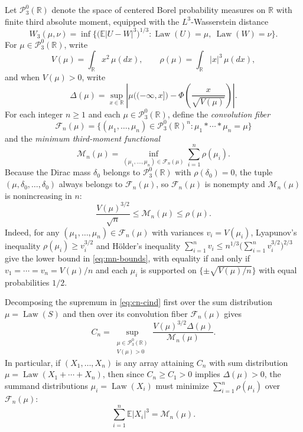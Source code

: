 \documentclass[11pt]{article}
\numberwithin{equation}{section}
\theoremstyle{definition}
\theoremstyle{remark}
\DeclareMathOperator{\Law}{Law}
\newcommand{\E}{\mathbb E}
\newcommand{\R}{\mathbb R}
\begin{document}
Let $\mathcal P_3^0(\R)$ denote the space of centered Borel probability
measures on $\R$ with finite third absolute moment, equipped with the
$L^3$-Wasserstein distance
\[
 W_3(\mu,\nu)=\inf\bigl\{\bigl(\E|U-W|^3\bigr)^{1/3}:\Law(U)=\mu,\ \Law(W)=\nu\bigr\}.
\]
For $\mu\in\mathcal P_3^0(\R)$, write
\[
 V(\mu)=\int_\R x^2\,\mu(dx),\qquad
 \rho(\mu)=\int_\R |x|^3\,\mu(dx),
\]
and when $V(\mu)>0$, write
\[
 \Delta(\mu)=\sup_{x\in\R}\left|\mu\bigl((-\infty,x]\bigr)-\Phi\!\left(\frac{x}{\sqrt{V(\mu)}}\right)\right|.
\]
For each integer $n\ge1$ and each $\mu\in\mathcal P_3^0(\R)$, define the
\emph{convolution fiber}
\begin{equation}\label{eq:fiber-def}
 \mathcal F_n(\mu)=\bigl\{(\mu_1,\ldots,\mu_n)\in\mathcal P_3^0(\R)^n:
 \mu_1*\cdots*\mu_n=\mu\bigr\}
\end{equation}
and the \emph{minimum third-moment functional}
\begin{equation}\label{eq:mn-def}
 \mathcal M_n(\mu)=\inf_{(\mu_1,\ldots,\mu_n)\in\mathcal F_n(\mu)}
 \sum_{i=1}^n\rho(\mu_i).
\end{equation}
Because the Dirac mass $\delta_0$ belongs to $\mathcal P_3^0(\R)$ with
$\rho(\delta_0)=0$, the tuple $(\mu,\delta_0,\ldots,\delta_0)$ always belongs
to $\mathcal F_n(\mu)$, so $\mathcal F_n(\mu)$ is nonempty and
$\mathcal M_n(\mu)$ is nonincreasing in $n$:
\begin{equation}\label{eq:mn-bounds}
 \frac{V(\mu)^{3/2}}{\sqrt n}\le \mathcal M_n(\mu)\le \rho(\mu).
\end{equation}
Indeed, for any $(\mu_1,\ldots,\mu_n)\in\mathcal F_n(\mu)$ with variances
$v_i=V(\mu_i)$, Lyapunov's inequality $\rho(\mu_i)\ge v_i^{3/2}$ and H\"older's
inequality $\sum_{i=1}^n v_i\le n^{1/3}\bigl(\sum_{i=1}^n v_i^{3/2}\bigr)^{2/3}$
give the lower bound in \eqref{eq:mn-bounds}, with equality if and only if
$v_1=\cdots=v_n=V(\mu)/n$ and each $\mu_i$ is supported on
$\{\pm\sqrt{V(\mu)/n}\}$ with equal probabilities $1/2$.

Decomposing the supremum in \eqref{eq:cn-cind} first over the sum distribution
$\mu=\Law(S)$ and then over its convolution fiber $\mathcal F_n(\mu)$ gives
\begin{equation}\label{eq:two-stage-opt}
 C_n=\sup_{\substack{\mu\in\mathcal P_3^0(\R)\\ V(\mu)>0}}
 \frac{V(\mu)^{3/2}\Delta(\mu)}{\mathcal M_n(\mu)}.
\end{equation}
In particular, if $(X_1,\ldots,X_n)$ is any array attaining $C_n$ with sum
distribution $\mu=\Law(X_1+\cdots+X_n)$, then since $C_n\ge C_1>0$ implies
$\Delta(\mu)>0$, the summand distributions $\mu_i=\Law(X_i)$ must minimize
$\sum_{i=1}^n\rho(\mu_i)$ over $\mathcal F_n(\mu)$:
\begin{equation}\label{eq:maximizer-minimizes-price}
 \sum_{i=1}^n\E|X_i|^3=\mathcal M_n(\mu).
\end{equation}
\end{document}
